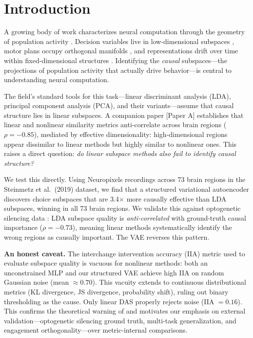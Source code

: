 \documentclass{article}
\begin{document}
\section{Introduction}

A growing body of work characterizes neural computation through the geometry of population activity \citep{cunningham2014dimensionality, gallego2017neural}. Decision variables live in low-dimensional subspaces \citep{steinmetz2019distributed}, motor plans occupy orthogonal manifolds \citep{gallego2017neural}, and representations drift over time within fixed-dimensional structures \citep{driscoll2022representational}. Identifying the \emph{causal} subspaces---the projections of population activity that actually drive behavior---is central to understanding neural computation.

The field's standard tools for this task---linear discriminant analysis (LDA), principal component analysis (PCA), and their variants---assume that causal structure lies in linear subspaces. A companion paper [Paper A] establishes that linear and nonlinear similarity metrics anti-correlate across brain regions ($\rho = -0.85$), mediated by effective dimensionality: high-dimensional regions appear dissimilar to linear methods but highly similar to nonlinear ones. This raises a direct question: \emph{do linear subspace methods also fail to identify causal structure?}

We test this directly. Using Neuropixels recordings across 73 brain regions in the Steinmetz et al.\ (2019) dataset, we find that a structured variational autoencoder \citep{narayanaswamy2017learning} discovers choice subspaces that are 3.4$\times$ more causally effective than LDA subspaces, winning in all 73 brain regions. We validate this against optogenetic silencing data \citep{zatkahaas2021spatiotemporal}: LDA subspace quality is \emph{anti-correlated} with ground-truth causal importance ($\rho = -0.73$), meaning linear methods systematically identify the wrong regions as causally important. The VAE reverses this pattern.

\textbf{An honest caveat.} The interchange intervention accuracy (IIA) metric used to evaluate subspace quality is vacuous for nonlinear methods: both an unconstrained MLP and our structured VAE achieve high IIA on random Gaussian noise (mean $\approx 0.70$). This vacuity extends to continuous distributional metrics (KL divergence, JS divergence, probability shift), ruling out binary thresholding as the cause. Only linear DAS properly rejects noise (IIA $= 0.16$). This confirms the theoretical warning of \citet{sutter2025iia} and motivates our emphasis on external validation---optogenetic silencing ground truth, multi-task generalization, and engagement orthogonality---over metric-internal comparisons.
\end{document}
